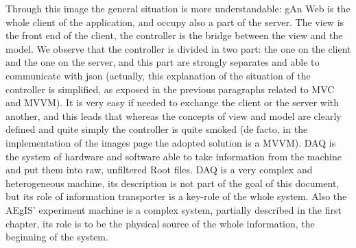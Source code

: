 Through this image the general situation is more understandable: gAn Web is the whole client of the application, and occupy also a part of the server. The view is the front end of the client, the controller is the bridge between the view and the model. We observe that the controller is divided in two part: the one on the client and the one on the server, and this part are strongly separates and able to communicate with json (actually, this explanation of the situation of the controller is simplified, as exposed in the previous paragraphs related to MVC and MVVM). It is very easy if needed to exchange the client or the server with another, and this leads that whereas the concepts of view and model are clearly defined and quite simply the controller is quite smoked (de facto, in the implementation of the images page the adopted solution is a MVVM). DAQ is the system of hardware and software able to take information from the machine and put them into raw, unfiltered Root files. DAQ is a very complex and heterogeneous machine, its description is not part of the goal of this document, but its role of information transporter is a key-role of the whole system. Also the AEgIS' experiment machine is a complex system, partially described in the first chapter, its role is to be the physical source of the whole information, the beginning of the system.

      